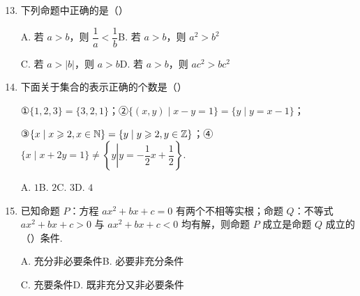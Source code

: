 \documentclass[a4paper,11pt]{article}
\begin{document}

\begin{enumerate}
\setcounter{enumi}{12}

\item 下列命题中正确的是\mbox{（\quad）}

\keepwithprev
A. 若 $a>b$，则 $\dfrac1a<\dfrac1b$\qquad B. 若 $a>b$，则 $a^2>b^2$

C. 若 $a>\lvert b\rvert$，则 $a>b$\qquad D. 若 $a>b$，则 $ac^2>bc^2$

\ifanswer
\solbegin
{}
\solend
\fi

\item 下面关于集合的表示正确的个数是\mbox{（\quad）}

①$\{1,2,3\}=\{3,2,1\}$；\quad ②$\{(x,y)\mid x-y=1\}=\{y\mid y=x-1\}$；

③$\{x\mid x\geqslant2,x\in\mathbb{N}\}=\{y\mid y\geqslant2,y\in\mathbb{Z}\}$；\quad ④$\{x\mid x+2y=1\}\neq\left\{y\left|y=-\dfrac12x+\dfrac12\right.\right\}$.

\keepwithprev
A. $1$\qquad B. $2$\qquad C. $3$\qquad D. $4$

\ifanswer
\solbegin
{}
\solend
\fi

\item 已知命题 $P$：方程 $ax^2+bx+c=0$ 有两个不相等实根；命题 $Q$：不等式 $ax^2+bx+c>0$ 与 $ax^2+bx+c<0$ 均有解，则命题 $P$ 成立是命题 $Q$ 成立的\mbox{（\quad）}条件.

\keepwithprev
A. 充分非必要条件\qquad B. 必要非充分条件

C. 充要条件\qquad D. 既非充分又非必要条件


\end{enumerate}
\end{document}
